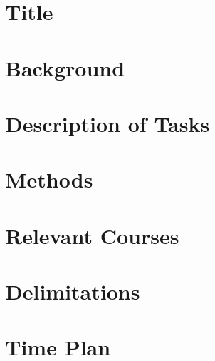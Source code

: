 \documentclass[a4, 12pt]{article}
\begin{document}
\newpage

\setcounter{page}{2}
\tableofcontents
\newpage

\section{Title}
\section{Background}
\section{Description of Tasks}
\section{Methods}
\section{Relevant Courses}
\section{Delimitations}
\section{Time Plan}



\end{document}
